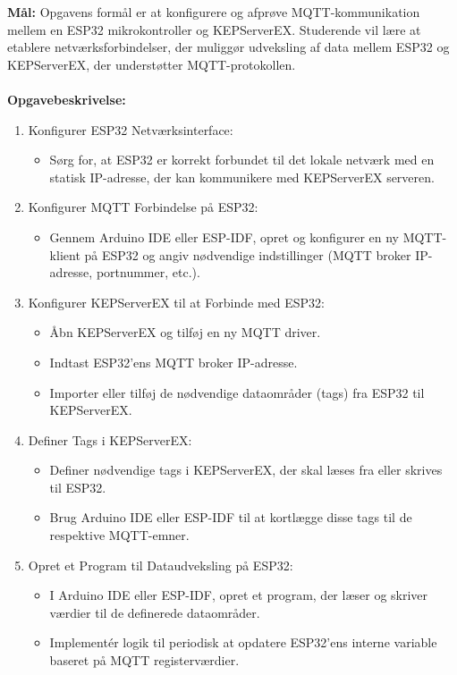 \textbf{Mål:} Opgavens formål er at konfigurere og afprøve MQTT-kommunikation mellem en ESP32 mikrokontroller og KEPServerEX. Studerende vil lære at etablere netværksforbindelser, der muliggør udveksling af data mellem ESP32 og KEPServerEX, der understøtter MQTT-protokollen.
\\\\
\noindent\textbf{Opgavebeskrivelse:}
\begin{enumerate}
	\item Konfigurer ESP32 Netværksinterface:
	\begin{itemize}
		\item Sørg for, at ESP32 er korrekt forbundet til det lokale netværk med en statisk IP-adresse, der kan kommunikere med KEPServerEX serveren.
	\end{itemize}
	\item Konfigurer MQTT Forbindelse på ESP32:
	\begin{itemize}
		\item Gennem Arduino IDE eller ESP-IDF, opret og konfigurer en ny MQTT-klient på ESP32 og angiv nødvendige indstillinger (MQTT broker IP-adresse, portnummer, etc.).
	\end{itemize}
	\item Konfigurer KEPServerEX til at Forbinde med ESP32:
	\begin{itemize}
		\item Åbn KEPServerEX og tilføj en ny MQTT driver.
		\item Indtast ESP32’ens MQTT broker IP-adresse.
		\item Importer eller tilføj de nødvendige dataområder (tags) fra ESP32 til KEPServerEX.
	\end{itemize}
	\item Definer Tags i KEPServerEX:
	\begin{itemize}
		\item Definer nødvendige tags i KEPServerEX, der skal læses fra eller skrives til ESP32.
		\item Brug Arduino IDE eller ESP-IDF til at kortlægge disse tags til de respektive MQTT-emner.
	\end{itemize}
	\item Opret et Program til Dataudveksling på ESP32:
	\begin{itemize}
		\item I Arduino IDE eller ESP-IDF, opret et program, der læser og skriver værdier til de definerede dataområder.
		\item Implementér logik til periodisk at opdatere ESP32'ens interne variable baseret på MQTT registerværdier.

\end{itemize}
\end{enumerate}
